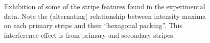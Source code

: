\begin{figure}
  \centering
  \caption{Exhibition of some of the stripe features found in the
    experimental data.  Note the (alternating) relationship between intensity
    maxima on each primary stripe and their ``hexagonal packing''. This
    interference effect is from primary and secondary stripes.}
  \label{fig:hexagonalpacking2}
\end{figure}
